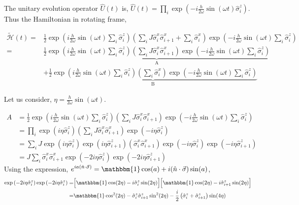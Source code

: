 \documentclass[aps,prb,reprint,showpacs,floatfix,superscriptaddress, onecolumn, nofootinbib, 9pt]{revtex4-2}
\begin{document}
\begin{enumerate}
{The unitary evolution operator $\displaystyle \hat{U}(t)$ is, $\hat{U}(t)=\prod_{i} \exp \left(-i \frac{h}{2 \omega} \sin (\omega t) \hat{\sigma}_{i}^{z}\right)$. Thus the Hamiltonian in rotating frame,

\begin{align}
	\tilde{\mathcal{H}}(t)= & \frac{1}{2} \exp \left(i \frac{h}{2 \omega} \sin (\omega t) \sum_{i} \hat{\sigma}_{i}^{z}\right)\left(\sum_{i} J \hat{\sigma}_{i}^{x} \hat{\sigma}_{i+1}^{x}+\sum_{i} \hat{\sigma}_{i}^{x}\right) \exp \left(-i \frac{h}{2 \omega} \sin (\omega t) \sum_i\hat{\sigma}_{i}^{z}\right) \nonumber\\
	= & \underbrace{\frac{1}{2} \exp \left(i \frac{h}{2 \omega} \sin (\omega t) \sum_{i} \hat{\sigma}_{i}^{z}\right)\left(\sum_{i} J \hat{\sigma}_{i}^{x} \hat{\sigma}_{i+1}^{x}\right) \exp \left(-i \frac{h}{2 \omega} \sin (\omega t) \sum_i\hat{\sigma}_{i}^{z}\right)}_{\mathrm{A}} \nonumber\\
	& +\underbrace{\frac{1}{2} \exp \left(i \frac{h}{2 \omega} \sin (\omega t) \sum_{i} \hat{\sigma}_{i}^{z}\right)\left(\sum_{i} \hat{\sigma}_{i}^{x}\right) \exp \left(-i \frac{h}{2 \omega} \sin (\omega t) \sum_i\hat{\sigma}_{i}^{z}\right)}_{\mathrm{B}}
\end{align}

Let us consider, $\eta=\frac{h}{2 \omega} \sin (\omega t)$.


\begin{align}
	A & =\frac{1}{2} \exp \left(i \frac{h}{2 \omega} \sin (\omega t) \sum_{i} \hat{\sigma}_{i}^{z}\right)\left(\sum_{i} J \hat{\sigma}_{i}^{x} \hat{\sigma}_{i+1}^{x}\right) \exp \left(-i \frac{h}{2 \omega} \sin (\omega t) \sum_i\hat{\sigma}_{i}^{z}\right) \nonumber\\
	&= \prod_i \exp\left(i\eta\hat{\sigma}^z_i\right)\left(\sum_{i} J \hat{\sigma}_{i}^{x} \hat{\sigma}_{i+1}^{x}\right)\exp\left(-i\eta\hat{\sigma}^z_i\right)\nonumber\\
	&= \sum_i J \exp(i\eta\hat{\sigma}^z_i)\exp(i\eta\hat{\sigma}^z_{i+1})\left( \hat{\sigma}_{i}^{x} \hat{\sigma}_{i+1}^{x}\right)\exp(-i\eta\hat{\sigma}^z_i)\exp(-i\eta\hat{\sigma}^z_{i+1})\nonumber\\
	&= J\sum_{i} \hat{\sigma}_{i}^{x} \hat{\sigma}_{i+1}^{x}\exp(-2i\eta\hat{\sigma}^z_i)\exp(-2i\eta\hat{\sigma}^z_{i+1})
	\label{eq:hmov}
\end{align}
Using the expression, $\displaystyle e^{ia(\hat{n}\cdot \vec{\sigma})} = \mathbbm{1} \cos(a) + i (\hat{n}\cdot \vec{\sigma})\sin(a)$, 
\begin{align}
	\exp\left(-2i\eta\hat{\sigma}^z_i\right)\exp\left(-2i\eta\hat{\sigma}^z_i\right)
	=& \Big[\mathbbm{1} \cos(2\eta) - i \hat{\sigma}^z_i\sin(2\eta)\Big]\Big[\mathbbm{1} \cos(2\eta) - i \hat{\sigma}^z_{i+1}\sin(2\eta)\Big]\nonumber\\
	=& \mathbbm{1} \cos^2(2\eta) - \hat{\sigma}^z_i\hat{\sigma}^z_{i+1}\sin^2(2\eta) -\frac{i}{2} \left(\hat{\sigma}^z_i+ \hat{\sigma}^z_{i+1}\right)\sin(4\eta)
	\label{eq:op}
\end{align}

}
\end{enumerate}
\end{document}
